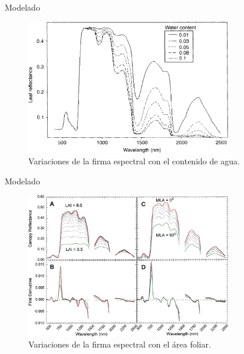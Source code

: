 \documentclass[handout]{beamer}
\begin{document}
\begin{frame}{Modelado}
    \begin{figure}
    \centering
    \includegraphics[width=0.8\textwidth]{imagenes/vwvar.png}
    \caption{Variaciones de la firma espectral con el contenido de agua.}
    \end{figure}
\end{frame}

\begin{frame}{Modelado}
    \begin{figure}
    \centering
    \includegraphics[width=0.8\textwidth]{imagenes/leafvar.png}
    \caption{Variaciones de la firma espectral con el \'area foliar.}
    \end{figure}
\end{frame}
\end{document}
